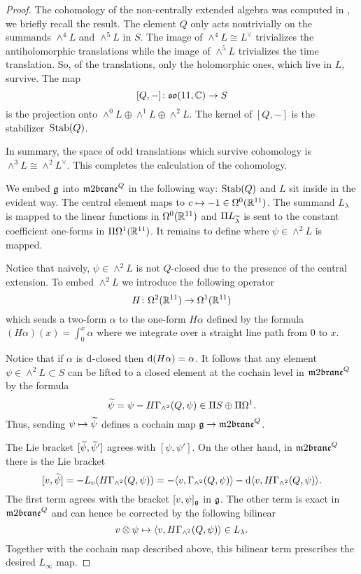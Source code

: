 \begin{proof}

The cohomology of the non-centrally extended algebra was computed in \cite{SWspinor}, we briefly recall the result. 
The element $Q$ only acts nontrivially on the summands $\wedge^4 L$ and $\wedge^5 L$ in $S$. 
The image of $\wedge^4 L \cong L^\vee$ trivializes the antiholomorphic translations while the image of $\wedge^5 L$ trivializes the time translation.
So, of the translations, only the holomorphic ones, which live in $L$, survive.
The map 
\[
[Q,-] \colon \lie{so}(11,\CC) \to S 
\] 
is the projection onto $\wedge^0 L \oplus \wedge^1 L \oplus \wedge^2 L$. 
The kernel of $[Q,-]$ is the stabilizer~${\rm Stab}(Q)$.

In summary, the space of odd translations which survive cohomology is $\wedge^3 L \cong \wedge^2 L^\vee$.
This completes the calculation of the cohomology. 

We embed $\fg$ into $\m2^Q$ in the following way: ${\rm Stab}(Q)$ and $L$ sit inside in the evident way.
The central element maps to $c \mapsto - 1 \in \Omega^0(\RR^{11})$.
The summand $L_\lambda$ is mapped to the linear functions in $\Omega^0(\RR^{11})$ and $\Pi L_{\Tilde{\lambda}}$ is sent to the constant coefficient one-forms in $\Pi \Omega^1(\RR^{11})$. 
It remains to define where $\psi \in \wedge^2 L$ is mapped.

Notice that naively, $\psi \in \wedge^2 L$ is not $Q$-closed due to the presence of the central extension. 
To embed $\wedge^2 L$ we introduce the following operator
\[
H \colon \Omega^2 (\RR^{11}) \to \Omega^1(\RR^{11})
\]
which sends a two-form $\alpha$ to the one-form $H \alpha$ defined by the formula $(H \alpha) (x) = \int_0^x \alpha$
where we integrate over a straight line path from $0$ to $x$.

Notice that if $\alpha$ is $\d$-closed then $\d (H \alpha) = \alpha$. 
It follows that any element $\psi \in \wedge^2 L \subset S$ can be lifted to a closed element at the cochain level in $\m2^Q$ by the formula
\[
\Tilde{\psi} = \psi - H \Gamma_{\wedge^2} (Q, \psi) \in \Pi S \oplus \Pi \Omega^1 .
\]
Thus, sending $\psi \mapsto \Tilde{\psi}$ defines a cochain map $\fg \to \m2^Q$. 

The Lie bracket $[\Tilde{\psi}, \Tilde{\psi}']$ agrees with $[\psi, \psi']$. 
On the other hand, in $\m2^Q$ there is the Lie bracket 
\[
[v,\Tilde{\psi}] = - L_v (H \Gamma_{\wedge^2} (Q, \psi)) = -\<v, \Gamma_{\wedge^2}(Q, \psi)\> - \d \<v, H \Gamma_{\wedge^2}(Q, \psi)\> .
\]
The first term agrees with the bracket $[v, \psi]_{\fg}$ in $\fg$. 
The other term is exact in $\m2^Q$ and can hence be corrected by the following bilinear  
\[
v \otimes \psi \mapsto \<v, H \Gamma_{\wedge^2} (Q,\psi) \> \in L_\lambda .
\] 
Together with the cochain map described above, this bilinear term prescribes the desired $L_\infty$ map. 

\end{proof}

